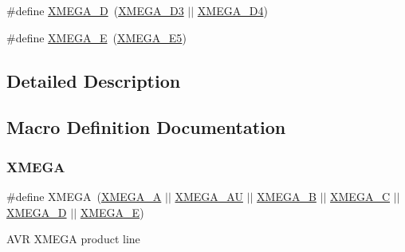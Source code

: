 \begin{DoxyCompactItemize}
\item 
\#define \mbox{\hyperlink{group__xmega__part__macros__group_gacc9e4b074c3f87ce7b461483b0beb15c}{X\+M\+E\+G\+A\+\_\+D}}~(\mbox{\hyperlink{group__xmega__part__macros__group_gad634208a506f79622c67be500014feb3}{X\+M\+E\+G\+A\+\_\+\+D3}} $\vert$$\vert$ \mbox{\hyperlink{group__xmega__part__macros__group_ga831e633408c7458a445d333b9b3f142f}{X\+M\+E\+G\+A\+\_\+\+D4}})
\item 
\#define \mbox{\hyperlink{group__xmega__part__macros__group_gaab6d2543c5128fca0b1aeecb5c080723}{X\+M\+E\+G\+A\+\_\+E}}~(\mbox{\hyperlink{group__xmega__part__macros__group_ga3bbcf2e955c9747a3595f8cdc01436ba}{X\+M\+E\+G\+A\+\_\+\+E5}})
\end{DoxyCompactItemize}


\subsection{Detailed Description}


\subsection{Macro Definition Documentation}
\mbox{\label{group__xmega__part__macros__group_ga959bff90afbae437308a52eeb67b3368}} 
\subsubsection{\texorpdfstring{XMEGA}{XMEGA}}
{\footnotesize\ttfamily \#define X\+M\+E\+GA~(\mbox{\hyperlink{group__xmega__part__macros__group_gab903a90d3a0bc99d7248eaecbb325a23}{X\+M\+E\+G\+A\+\_\+A}} $\vert$$\vert$ \mbox{\hyperlink{group__xmega__part__macros__group_ga55210f3805902072fce76647b50fa177}{X\+M\+E\+G\+A\+\_\+\+AU}} $\vert$$\vert$ \mbox{\hyperlink{group__xmega__part__macros__group_ga62f2c1c93640237425cb64186ddce219}{X\+M\+E\+G\+A\+\_\+B}} $\vert$$\vert$ \mbox{\hyperlink{group__xmega__part__macros__group_ga75b06dd59d29b1de54dd73fe67830973}{X\+M\+E\+G\+A\+\_\+C}} $\vert$$\vert$ \mbox{\hyperlink{group__xmega__part__macros__group_gacc9e4b074c3f87ce7b461483b0beb15c}{X\+M\+E\+G\+A\+\_\+D}} $\vert$$\vert$ \mbox{\hyperlink{group__xmega__part__macros__group_gaab6d2543c5128fca0b1aeecb5c080723}{X\+M\+E\+G\+A\+\_\+E}})}

A\+VR X\+M\+E\+GA product line \mbox{\label{group__xmega__part__macros__group_gab903a90d3a0bc99d7248eaecbb325a23}} 
